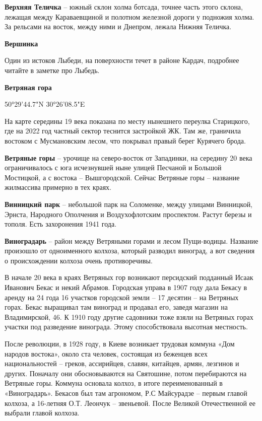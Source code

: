 \textbf{Верхняя Теличка} – южный склон холма ботсада, точнее часть этого склона, лежащая между Караваевщиной и полотном железной дороги у подножия холма. За рельсами на восток, между ними и Днепром, лежала Нижняя Теличка.\\

\medskip

\textbf{Вершинка}

Один из истоков Лыбеди, на поверхности течет в районе Кардач, подробнее читайте в заметке про Лыбедь. 

\medskip


\textbf{Ветряная гора}

50°29'44.7"N 30°26'08.5"E

На карте середины 19 века показана по месту нынешнего переулка Старицкого, где на 2022 год частный сектор теснится застройкой ЖК. Там же, граничила востоком с Мусмановским лесом, что покрывал правый берег Курячего брода.\\

\medskip

\textbf{Ветряные горы} – урочище на северо-восток от Западинки, на середину 20 века ограничивалось с юга исчезнувшей ныне улицей Песчаной и Большой Мостицкой, а с востока – Вышгородской. Сейчас Ветряные горы – название жилмассива примерно в тех краях.\\

\medskip

\textbf{Винницкий парк} – небольшой парк на Соломенке, между улицами Винницкой, Эрнста, Народного Ополчения и Воздухофлотским проспектом. Растут березы и тополя. Есть захоронения 1941 года.\\

\medskip

\textbf{Виноградарь} – район между Ветряными горами и лесом Пущи-водицы. Название произошло от одноименного колхоза, который разводил виноград, а вот сведения о происхождении колхоза очень противоречивы.

В начале 20 века в краях Ветряных гор возникают персидский подданный Исаак Иванович Бекас и некий Абрамов. Городская управа в 1907 году дала Бекасу в аренду на 24 года 16 участков городской земли – 17 десятин – на Ветряных горах. Бекас выращивал там виноград и продавал его, заведя магазин на Владимирской, 46. К 1910 году другие садовники тоже взяли на Ветряных горах участки под разведение винограда. Этому способствовала высотная местность.

После революции, в 1928 году, в Киеве возникает трудовая коммуна «Дом народов востока», около ста человек, состоящая из беженцев всех национальностей – греков, ассирийцев, славян, китайцев, армян, лезгинов и других. Поначалу они обосновываются на Святошине, потом перебираются на Ветряные горы. Коммуна основала колхоз, в итоге переименованный в «Виноградарь». Бекасов был там агрономом, Р.С Майсурадзе – первым главой колхоза, а 16-летняя О.Т. Леончук – звеньевой. После Великой Отечественной ее выбрали главой колхоза.

